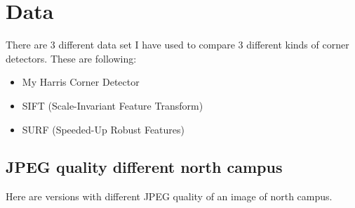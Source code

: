 \documentclass[12pt]{article}
\begin{document}
\section{Data}
There are 3 different data set I have used to compare 3 different kinds of corner detectors. These are following:

\begin{itemize}
    \item My Harris Corner Detector
    \item SIFT (Scale-Invariant Feature Transform)
    \item SURF (Speeded-Up Robust  Features)
\end{itemize}

\subsection{JPEG quality different north campus}
Here are versions with different JPEG quality of an image of north campus.
\end{document}
